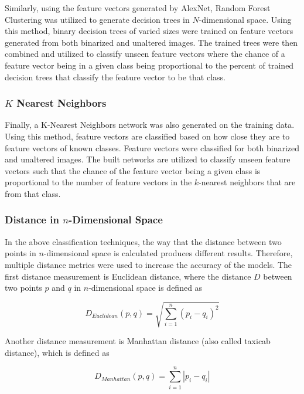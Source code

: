 Similarly, using the feature vectors generated by AlexNet, Random Forest Clustering was utilized to generate decision trees in $N$-dimensional space. Using this method, binary decision trees of varied sizes were trained on feature vectors generated from both binarized and unaltered images. The trained trees were then combined and utilized to classify unseen feature vectors where the chance of a feature vector being in a given class being proportional to the percent of trained decision trees that classify the feature vector to be that class.

\subsubsection{$K$ Nearest Neighbors}

Finally, a K-Nearest Neighbors network was also generated on the training data. Using this method, feature vectors are classified based on how close they are to feature vectors of known classes. Feature vectors were classified for both binarized and unaltered images. The built networks are utilized to classify unseen feature vectors such that the chance of the feature vector being a given class is proportional to the number of feature vectors in the $k$-nearest neighbors that are from that class.

\subsubsection{Distance in $n$-Dimensional Space}
In the above classification techniques, the way that the distance between two points in $n$-dimensional space is calculated produces different results. Therefore, multiple distance metrics were used to increase the accuracy of the models. The first distance measurement is Euclidean distance, where the distance $D$ between two points $p$ and $q$ in $n$-dimensional space is defined as

\begin{equation}
  \label{eq:distanceEuclidian}
  D_{Euclidean}(p,q) = \sqrt{\sum_{i=1}^{n} (p_i - q_i)^2}
\end{equation}

Another distance measurement is Manhattan distance (also called taxicab distance), which is defined as

\begin{equation}
  \label{eq:distanceManhattan}
  D_{Manhattan}(p,q) = \sum_{i=1}^{n} |p_i - q_i|
\end{equation}

